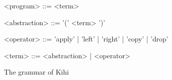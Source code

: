 \begin{figure}[htb]
    \begin{mdframed}
    
    \begin{grammar}
    <program> ::= { <term> }

    <abstraction> ::= '(' <term> ')'

    <operator> ::= 'apply' | 'left' | 'right' | 'copy' | 'drop'

    <term> ::= <abstraction> | <operator>
    \end{grammar}
    \end{mdframed}
    \caption{The grammar of Kihi}
    \label{fig:kihi_grammar}
\end{figure}
